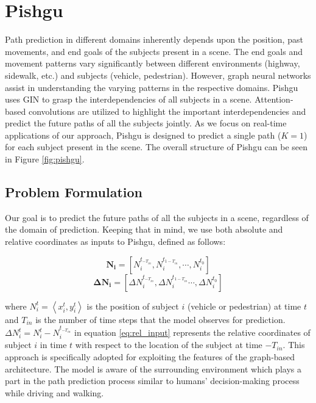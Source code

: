 \documentclass[sigconf]{acmart}
\begin{document}
 \section{Pishgu} \label{sec:pishgu}
Path prediction in different domains inherently depends upon the position, past movements, and end goals of the subjects present in a scene. The end goals and movement patterns vary significantly between different environments (highway, sidewalk, etc.) and subjects (vehicle, pedestrian). However, graph neural networks assist in understanding the varying patterns in the respective domains. Pishgu uses GIN to grasp the interdependencies of all subjects in a scene. Attention-based convolutions are utilized to highlight the important interdependencies and predict the future paths of all the subjects jointly. As we focus on real-time applications of our approach, Pishgu is designed to predict a single path ($K=1$) for each subject present in the scene. The overall structure of Pishgu can be seen in Figure \ref{fig:pishgu}.


\subsection{Problem Formulation}
Our goal is to predict the future paths of all the subjects in a scene, regardless of the domain of prediction. Keeping that in mind, we use both absolute and relative coordinates as inputs to Pishgu, defined as follows:

\begin{equation}
     \label{eq:input}
    \boldsymbol{N_i}=[N_{i}^{t_{-T_{in}}} ,N_{i}^{t_{1-T_{in}}} ,\cdots , N_{i}^{t_{0}}]
\end{equation}    
\begin{equation}
\label{eq:rel_input}
\boldsymbol{\Delta N_i} = [\Delta N_{i}^{t_{-T_{in}}} ,\Delta N_{i}^{t_{1-T_{in}}} \cdots  ,\Delta N_{i}^{t_{0}}]
\end{equation}        
    
where $N_{i}^{t}=\left<x_{i}^{t}, y_{i}^{t}\right>$ is the position of subject $i$ (vehicle or pedestrian)  at time $t$ and $T_{in}$ is the number of time steps that the model observes for prediction. $\Delta N_{i}^{t} = N_i^t - N_i^{t_{-T_{in}}}$ in equation \ref{eq:rel_input} represents the relative coordinates of subject $i$ in time $t$ with respect to the location of the subject at time $-T_{in}$. This approach is specifically adopted for exploiting the features of the graph-based architecture. The model is aware of the surrounding environment which plays a part in the path prediction process similar to humans' decision-making process while driving and walking. 
\end{document}
